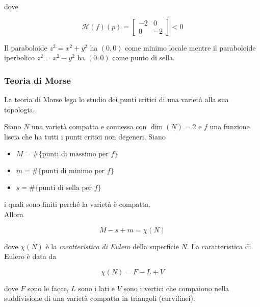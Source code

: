 dove

\begin{equation}
	\mathcal{H}(f)(p) = \begin{bmatrix} -2 & 0 \\ 0 & -2 \end{bmatrix} < 0
\end{equation}

Il paraboloide $ z^{2} = x^{2} + y^{2} $ ha $ (0,0) $ come minimo locale mentre il paraboloide iperbolico $ z^{2} = x^{2} - y^{2} $ ha $ (0,0) $ come punto di sella.

\subsubsection{Teoria di Morse}

La teoria di Morse lega lo studio dei punti critici di una varietà alla sua topologia.

\begin{theorem}
	Siano $ N $ una varietà compatta e connessa con $ \dim(N)=2 $ e $ f $ una funzione liscia che ha tutti i punti critici non degeneri. Siano
	
	\begin{itemize}
		\item $ M = \# \{ \text{punti di massimo per } f \} $
		
		\item $ m = \# \{ \text{punti di minimo per } f \} $
		
		\item $ s = \# \{ \text{punti di sella per } f \} $
	\end{itemize}

	i quali sono finiti perché la varietà è compatta.\\
	Allora
	
	\begin{equation}
		M - s + m = \chi(N)
	\end{equation}

	dove $ \chi(N) $ è la \textit{caratteristica di Eulero} della superficie $ N $. La caratteristica di Eulero è data da
	
	\begin{equation}
		\chi(N) = F - L + V
	\end{equation}

	dove $ F $ sono le facce, $ L $ sono i lati e $ V $ sono i vertici che compaiono nella suddivisione di una varietà compatta in triangoli (curvilinei).
\end{theorem}

